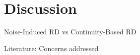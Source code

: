 \section{Discussion}
    
    \frame{\sectionpage}

    \begin{frame}{Noise-Induced RD vs Continuity-Based RD}

    \end{frame}
    
    \begin{frame}{Literature: Concerns addressed}
    
    \end{frame}

    